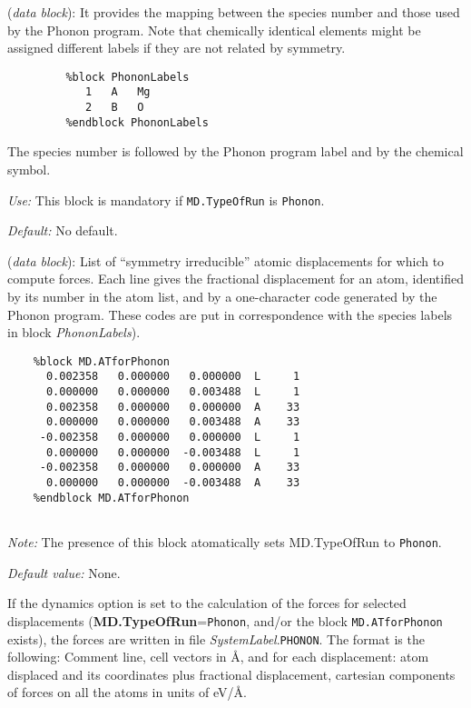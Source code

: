 \documentclass[11pt]{article}
\begin{document}
\begin{description}
\itemsep 10pt
\parsep 0pt

\item[{\bf PhononLabels}] ({\it data block}): 
It provides the mapping 
between the species number and those used by the {\sc
Phonon} program. Note that chemically identical elements might be
assigned different labels if they are not related by symmetry.

\begin{verbatim}
         %block PhononLabels
            1   A   Mg
            2   B   O
         %endblock PhononLabels
\end{verbatim}

The species number is followed by the {\sc
Phonon} program label and by the chemical symbol.

{\it Use:} This block is mandatory if {\tt MD.TypeOfRun} is {\tt Phonon}.

{\it Default:} No default. 

\item[{\bf MD.ATforPhonon}] ({\it data block}): List of ``symmetry
irreducible'' atomic displacements for which to compute forces. Each
line gives the fractional displacement for an atom, identified by its
number in the atom list, and by a one-character code generated by the
{\sc Phonon} program. These codes are put in correspondence with the
species labels in block \hbox{\it PhononLabels}).

\begin{verbatim}
    %block MD.ATforPhonon
      0.002358   0.000000   0.000000  L     1
      0.000000   0.000000   0.003488  L     1
      0.002358   0.000000   0.000000  A    33
      0.000000   0.000000   0.003488  A    33
     -0.002358   0.000000   0.000000  L     1
      0.000000   0.000000  -0.003488  L     1
     -0.002358   0.000000   0.000000  A    33
      0.000000   0.000000  -0.003488  A    33
    %endblock MD.ATforPhonon
  
\end{verbatim}

{\it Note:} The presence of this block 
atomatically sets MD.TypeOfRun to {\tt Phonon}.
 
{\it Default value:} None.

\end{description}

If the dynamics option is set to the calculation of the forces for
selected displacements ({\bf MD.TypeOfRun}={\tt Phonon}, and/or the
block {\tt MD.ATforPhonon} exists), the forces
are written in file {\it SystemLabel}.{\tt PHONON}.  The format is the
following: Comment line, cell vectors in {\AA}, and for each
displacement: atom displaced and its coordinates plus fractional
displacement, cartesian components of forces on all the atoms in units
of eV/\AA. 
\end{document}
